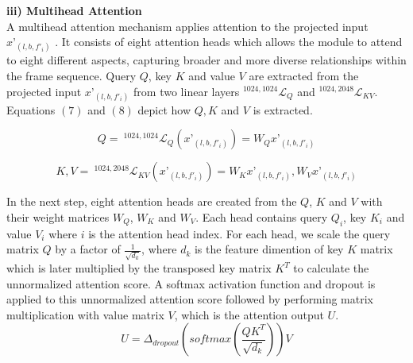 \documentclass[runningheads]{llncs}
\begin{document}
\noindent
\textbf{iii) Multihead Attention}\\

A multihead attention mechanism applies attention to the projected input $x’_{(l, b, f'_i)}$ . It consists of eight attention heads which allows the module to attend to eight different aspects, capturing broader and more diverse relationships within the frame sequence. Query $Q$, key $K$ and value $V$ are extracted from the projected input $x’_{(l, b, f'_i)}$ from two linear layers $^{1024, 1024}\! \mathcal{L}_Q$ and $^{1024, 2048}\!\mathcal{L}_{KV}$. Equations $(7)$ and $(8)$ depict how $Q, K$ and $V$ is extracted.

\begin{equation}
Q = \ ^{1024, 1024}\mathcal{L}_Q(x’_{(l, b, f'_i)}) = W_Q x’_{(l, b, f'_i)}
\end{equation}

\begin{equation}
K, V = \ ^{1024, 2048}\mathcal{L}_{KV}(x’_{(l, b, f'_i)}) 
= W_K x’_{(l, b, f'_i)} , W_V x’_{(l, b, f'_i)}
\end{equation}

In the next step, eight attention heads are created from the $Q$, $K$ and $V$ with their weight matrices $W_Q$, $W_K$ and $W_V$. Each head contains query $Q_i$, key $K_i$ and value $V_i$ where $i$ is the attention head index. For each head, we scale the query matrix $Q$ by a factor of $\frac{1}{\sqrt{d_k}}$, where $d_k$ is the feature dimention of key $K$ matrix which is later multiplied by the transposed key matrix $K^T$ to calculate the unnormalized attention score. A softmax activation function and dropout is applied to this unnormalized attention score followed by performing matrix multiplication with value matrix $V$, which is the attention output $U$.
\begin{equation}
U = \Delta_{dropout}(softmax(\frac{QK^T}{\sqrt{d_k}}))V
\end{equation}
\end{document}
